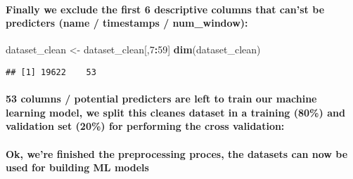 \documentclass[]{article}
\newenvironment{Shaded}{\begin{snugshade}}{\end{snugshade}}
\newcommand{\KeywordTok}[1]{\textcolor[rgb]{0.13,0.29,0.53}{\textbf{#1}}}
\newcommand{\DataTypeTok}[1]{\textcolor[rgb]{0.13,0.29,0.53}{#1}}
\newcommand{\DecValTok}[1]{\textcolor[rgb]{0.00,0.00,0.81}{#1}}
\newcommand{\FloatTok}[1]{\textcolor[rgb]{0.00,0.00,0.81}{#1}}
\newcommand{\StringTok}[1]{\textcolor[rgb]{0.31,0.60,0.02}{#1}}
\newcommand{\OtherTok}[1]{\textcolor[rgb]{0.56,0.35,0.01}{#1}}
\newcommand{\OperatorTok}[1]{\textcolor[rgb]{0.81,0.36,0.00}{\textbf{#1}}}
\newcommand{\NormalTok}[1]{#1}
\let\oldparagraph\paragraph
\renewcommand{\paragraph}[1]{\oldparagraph{#1}\mbox{}}
\begin{document}
\paragraph{Finally we exclude the first 6 descriptive columns that
can'st be predicters (name / timestamps /
num\_window):}\label{finally-we-exclude-the-first-6-descriptive-columns-that-canst-be-predicters-name-timestamps-num_window}

\begin{Shaded}
\begin{Highlighting}[]
\NormalTok{dataset_clean <-}\StringTok{ }\NormalTok{dataset_clean[,}\DecValTok{7}\OperatorTok{:}\DecValTok{59}\NormalTok{]}
\KeywordTok{dim}\NormalTok{(dataset_clean)}
\end{Highlighting}
\end{Shaded}

\begin{verbatim}
## [1] 19622    53
\end{verbatim}

\paragraph{53 columns / potential predicters are left to train our
machine learning model, we split this cleanes dataset in a training
(80\%) and validation set (20\%) for performing the cross
validation:}\label{columns-potential-predicters-are-left-to-train-our-machine-learning-model-we-split-this-cleanes-dataset-in-a-training-80-and-validation-set-20-for-performing-the-cross-validation}

\begin{Shaded}
\end{Shaded}

\paragraph{Ok, we're finished the preprocessing proces, the datasets can
now be used for building ML
models}\label{ok-were-finished-the-preprocessing-proces-the-datasets-can-now-be-used-for-building-ml-models}
\end{document}
